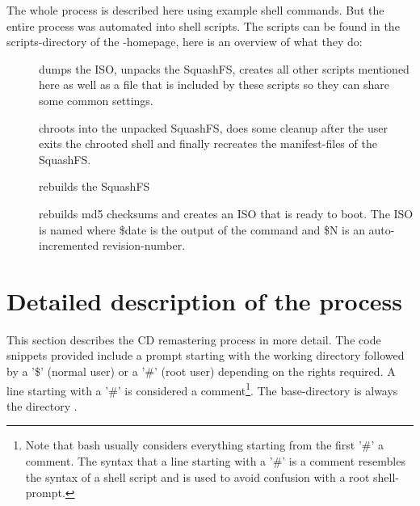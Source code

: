 The whole process is described here using example shell commands. But the entire
process was automated into shell scripts. The scripts can be found in the
scripts-directory of the \tunix-homepage, here is an overview of what they do:
\begin{description}
  \item[] dumps the ISO, unpacks the SquashFS, creates all
    other scripts mentioned here as well as a file  that is
    included by these scripts so they can share some common settings.
  \item[] chroots into the unpacked SquashFS, does some
    cleanup after the user exits the chrooted shell and finally recreates the
    manifest-files of the SquashFS.
  \item[] rebuilds the SquashFS
  \item[] rebuilds md5 checksums and creates an ISO that is
    ready to boot. The ISO is
    named  where \$date is the output of the
    command  and \$N is an auto-incremented
    revision-number.
\end{description}

\section{Detailed description of the process}
This section describes the CD remastering process in more detail. The code
snippets provided include a prompt starting with the working directory followed
by a '\$' (normal user) or a '\#' (root user) depending on the rights required.
A line starting with a '\#' is considered a comment\footnote{Note that bash
usually considers everything starting from the first '\#' a comment. The syntax
that a line starting with a '\#' is a comment resembles the syntax of a shell
script and is used to avoid confusion with a root shell-prompt.}. The
base-directory is always the directory .

